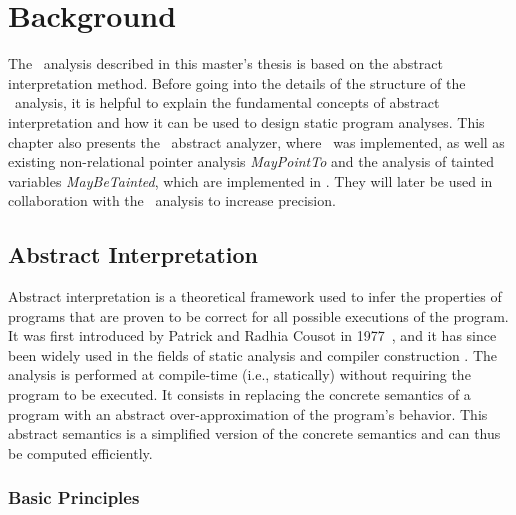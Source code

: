 \chapter{Background}\label{chapter:background}

The \cpo\ analysis described in this master's thesis is based on the abstract interpretation method.
Before going into the details of the structure of the \cpo\ analysis,
it is helpful to explain the fundamental concepts of abstract interpretation and how it can be used to design static program analyses.
This chapter also presents the \goblint\ abstract analyzer, where \cpo\ was implemented, as well as existing non-relational pointer analysis \emph{MayPointTo} and the analysis of tainted variables \emph{MayBeTainted}, which are implemented in \goblint.
They will later be used in collaboration with the \cpo\ analysis to increase precision.

\section{Abstract Interpretation}

Abstract interpretation is a theoretical framework used to infer the properties of programs that are proven to be correct for all possible executions of the program.
It was first introduced by Patrick and Radhia Cousot in 1977~\cite{ai,aibook}, and it has since been widely used in the fields of static analysis \cite{ai-static-analysis} and compiler construction \cite{ai-compiler-design}.
The analysis is performed at compile-time (i.e., statically) without requiring the program to be executed.
It consists in replacing the concrete
semantics of a program with an abstract over-approximation of the program's behavior.
This abstract semantics is a simplified version of the concrete semantics
and can thus be computed efficiently.

\subsection{Basic Principles}


